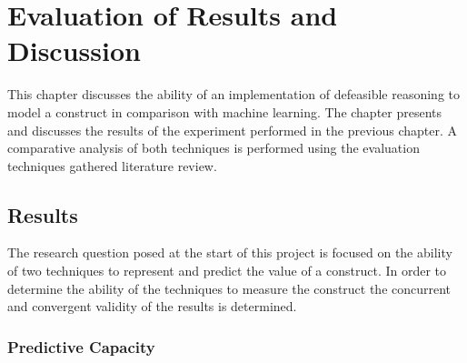 
\chapter{Evaluation of Results and Discussion} %

\label{Chapter5} %


This chapter discusses the ability of an implementation of defeasible reasoning to model a construct in comparison with machine learning. The chapter presents and discusses the results of the experiment performed in the previous chapter. A comparative analysis of both techniques is performed using the evaluation techniques gathered literature review.

\section{Results}


The research question posed at the start of this project is focused on the ability of two techniques to represent and predict the value of a construct. In order to determine the ability of the techniques to measure the construct the concurrent and convergent validity of the results is determined.

\subsection{Predictive Capacity}


